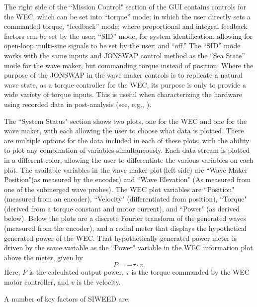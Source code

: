 \documentclass[11pt, letterpaper]{article}
\begin{document}
The right side of the ``Mission Control" section of the GUI  contains controls for the WEC, which can be set into ``torque'' mode; in which the user directly sets a commanded torque, ``feedback'' mode; where proportional and integral feedback factors can be set by the user; ``SID'' mode, for system identification, allowing for open-loop multi-sine signals to be set by the user; and ``off.''
The ``SID'' mode works with the same inputs and JONSWAP control method as the ``Sea State'' mode for the wave maker, but commanding torque instead of position.
Where the purpose of the JONSWAP in the wave maker controls is to replicate a natural wave state, as a torque controller for the WEC, its purpose is only to provide a wide variety of torque inputs. 
This is useful when characterizing the hardware using recorded data in post-analysis (see, e.g., \cite{Bacelli2017a}).

The ``System Status" section shows two plots, one for the WEC and one for the wave maker, with each allowing the user to choose what data is plotted. 
There are multiple options for the data included in each of these plots, with the ability to plot any combination of variables simultaneously.
Each data stream is plotted in a different color, allowing the user to differentiate the various variables on each plot.
The available variables in the wave maker plot\,(left side) are ``Wave Maker Position"(as measured by the encoder) and ``Wave Elevation" (As measured from one of the submerged wave probes).
The WEC plot variables are ``Position" (measured from an encoder), ``Velocity" (differentiated from position), ``Torque" (derived from a torque constant and motor current), and ``Power" (as derived below).
Below the plots are a discrete Fourier transform of the generated waves (measured from the encoder), and a radial meter that displays the hypothetical generated power of the WEC.
That hypothetically generated power meter is driven by the same variable as the ``Power" variable in the WEC information plot above the meter, given by
\begin{equation}
  P = -\tau \cdot v .
\end{equation}
Here, $P$ is the calculated output power, $\tau$ is the torque commanded by the WEC motor controller, and $v$ is the velocity.

A number of key factors of SIWEED are:
\end{document}
